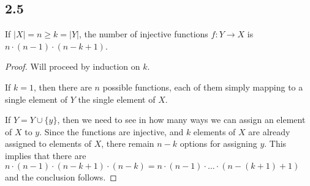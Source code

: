 \subsection*{2.5} If $|X| = n \geq k = |Y|$, the number of injective functions $f:Y \rightarrow X$ is $n \cdot (n-1) \cdot (n-k+1)$.

\begin{proof}
Will proceed by induction on $k$.

If $k = 1$, then there are $n$ possible functions, each of them simply mapping to a single element of $Y$ the single element of $X$.

If $Y = Y \cup \{y\}$, then we need to see in how many ways we can assign an element of $X$ to $y$. Since the functions are injective, and $k$ elements of $X$ are already assigned to elements of $X$, there remain $n-k$ options for assigning $y$. This implies that there are $n \cdot (n-1) \cdot (n-k+1) \cdot (n-k) = n \cdot (n-1) \cdot \dots \cdot (n-(k+1)+1)$ and the conclusion follows.


\end{proof}

